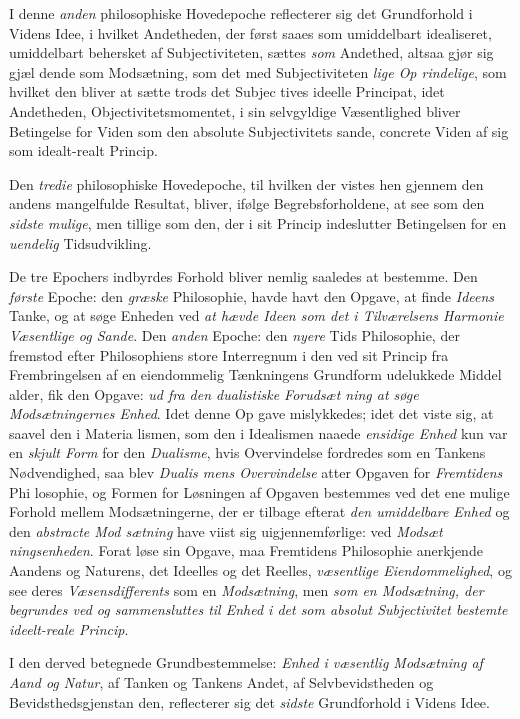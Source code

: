 I denne \emph{anden} philosophiske Hovedepoche reflecterer sig
det Grundforhold i Videns Idee, i hvilket Andetheden, der
først saaes som umiddelbart idealiseret, umiddelbart behersket
af Subjectiviteten, sættes \emph{som} Andethed, altsaa gjør sig gjæl\-%
dende som Modsætning, som det med Subjectiviteten \emph{lige Op\-%
rindelige}, som hvilket den bliver at sætte trods det Subjec\-%
tives ideelle Principat, idet Andetheden, Objectivitetsmomentet,
i sin selvgyldige Væsentlighed bliver Betingelse for Viden som
den absolute Subjectivitets sande, concrete Viden af sig som
idealt-realt Princip.

 Den \emph{tredie} philosophiske Hovedepoche, til hvilken der
vistes hen gjennem den andens mangelfulde Resultat, bliver,
ifølge Begrebsforholdene, at see som den \emph{sidste mulige},
men tillige som den, der i sit Princip indeslutter Betingelsen
for en \emph{uendelig} Tidsudvikling.

De tre Epochers indbyrdes Forhold bliver nemlig saaledes
at bestemme. Den \emph{første} Epoche: den \emph{græske} Philosophie,
havde havt den Opgave, at finde \emph{Ideens} Tanke, og at søge
Enheden ved \emph{at hævde Ideen som det i Tilværelsens
Harmonie Væsentlige og Sande}. Den \emph{anden} Epoche:
den \emph{nyere} Tids Philosophie, der fremstod efter Philosophiens
store Interregnum i den ved sit Princip fra Frembringelsen af
en eiendommelig Tænkningens Grundform udelukkede Middel\-%
alder, fik den Opgave: \emph{ud fra den dualistiske Forudsæt\-%
ning at søge Modsætningernes Enhed}. Idet denne Op\-%
gave mislykkedes; idet det viste sig, at saavel den i Materia\-%
lismen, som den i Idealismen naaede \emph{ensidige Enhed} kun
var en \emph{skjult Form} for den \emph{Dualisme}, hvis Overvindelse
fordredes som en Tankens Nødvendighed, saa blev \emph{Dualis\-%
mens Overvindelse} atter Opgaven for \emph{Fremtidens} Phi\-%
losophie, og Formen for Løsningen af Opgaven bestemmes ved
det ene mulige Forhold mellem Modsætningerne, der er tilbage
efterat \emph{den umiddelbare Enhed} og den \emph{abstracte Mod\-%
sætning} have viist sig uigjennemførlige: ved \emph{Modsæt\-%
ningsenheden}. Forat løse sin Opgave, maa Fremtidens
Philosophie anerkjende Aandens og Naturens, det Ideelles og
det Reelles, \emph{væsentlige Eiendommelighed}, og see deres
\emph{Væsensdifferents} som en \emph{Modsætning}, men \emph{som en
Modsætning, der begrundes ved og sammensluttes
til Enhed i det som absolut Subjectivitet bestemte
ideelt-reale Princip}.

I den derved betegnede Grundbestemmelse: \emph{Enhed i
væsentlig Modsætning af Aand og Natur}, af Tanken
og Tankens Andet, af Selvbevidstheden og Bevidsthedsgjenstan\-%
den, reflecterer sig det \emph{sidste} Grundforhold i Videns Idee.


